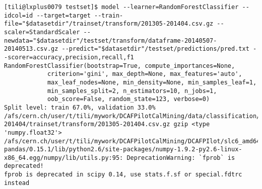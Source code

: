 
\begin{verbatim}
[tili@lxplus0079 testset]$ model --learner=RandomForestClassifier --idcol=id --target=target --train-file="$datasetdir"/trainset/transform/201305-201404.csv.gz --scaler=StandardScaler --newdata="$datasetdir"/testset/transform/dataframe-20140507-20140513.csv.gz --predict="$datasetdir"/testset/predictions/pred.txt --scorer=accuracy,precision,recall,f1
RandomForestClassifier(bootstrap=True, compute_importances=None,
            criterion='gini', max_depth=None, max_features='auto',
            max_leaf_nodes=None, min_density=None, min_samples_leaf=1,
            min_samples_split=2, n_estimators=10, n_jobs=1,
            oob_score=False, random_state=123, verbose=0)
Split level: train 67.0%, validation 33.0%
/afs/cern.ch/user/t/tili/mywork/DCAFPilotCalMining/data/classification/tier2/merge_conf_tier2_201305-201404/trainset/transform/201305-201404.csv.gz gzip <type 'numpy.float32'>
/afs/cern.ch/user/t/tili/mywork/DCAFPilotCalMining/DCAFPIlot/slc6_amd64_gcc481/external/py2-pandas/0.15.1/lib/python2.6/site-packages/numpy-1.9.2-py2.6-linux-x86_64.egg/numpy/lib/utils.py:95: DeprecationWarning: `fprob` is deprecated!
fprob is deprecated in scipy 0.14, use stats.f.sf or special.fdtrc instead


\end{verbatim}
